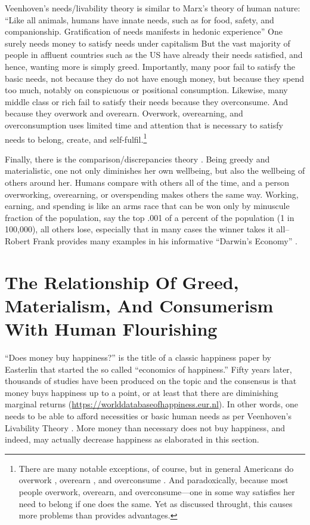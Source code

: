 \documentclass[10pt, letterpaper]{article}
\begin{document}
\begin{spacing}{1.8}
Veenhoven's needs/livability theory is similar to Marx's theory of human nature:
``Like all animals, humans have innate needs, such as for food, safety, and
companionship. Gratification of needs manifests in hedonic
experience''\citep[][p. 3645]{veenhoven14b}
One surely needs money to satisfy needs under capitalism But the vast majority
of people in affluent countries such as the US have already their needs
satisfied, and hence, wanting more is simply greed. Importantly, many poor fail
to satisfy the basic needs, not because they do not have enough money, but because they spend too much, notably on conspicuous or positional consumption. 
%
Likewise, many middle class or rich fail to satisfy their needs because
they overconsume. And  because they overwork and overearn. Overwork,
overearning, and overconsumption uses limited time and attention that is
necessary to satisfy needs to belong, create, and self-fulfil.\footnote{There
  are many notable exceptions, of course, but in general Americans do overwork \citep{aokditella},
  overearn \cite{hsee13}, and overconsume \cite{kasser13}. And paradoxically,
  because most people overwork, overearn, and overconsume---one in some way
  satisfies her need to belong if one does the same. Yet as discussed throught,
  this causes more problems than provides advantages.}  

Finally, there is the comparison/discrepancies theory \citep{michalos85}. Being
greedy and  materialistic, one not only diminishes her own wellbeing, but also the
wellbeing of others around her. Humans compare with others all of the time, and
a person overworking, overearning, or overspending makes others the same
way. Working, earning, and spending is like an arms race that can be won only by
minuscule fraction of the population, say the top .001 of a percent of the
population (1 in 100,000), all others lose, especially that in many cases the winner takes it all--Robert Frank provides many examples in his informative ``Darwin's Economy'' \citeyear{frank12}. 

\section{The Relationship Of Greed, Materialism, And Consumerism With  Human Flourishing}


``Does money buy happiness?'' is the title of a classic happiness paper by Easterlin \citeyear{easterlin73} that started the so called ``economics of happiness.'' Fifty
years later, thousands of studies have been produced on the topic and the consensus is that money buys happiness up to a point, or at least that there are diminishing marginal returns (\url{https://worlddatabaseofhappiness.eur.nl}).
%
%
% 
 In other words, one needs to be able to afford necessities or basic human needs as per Veenhoven's Livability Theory \citep{veenhoven14b}. More
 money than necessary does not buy happiness, and indeed, may actually decrease happiness as elaborated in this section.


\end{spacing}
\end{document}

